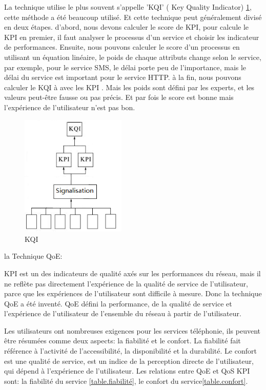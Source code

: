 La technique utilise le plus souvent s'appelle 'KQI' ( Key Quality Indicator) \ref{fig:kqi}, cette méthode a été beaucoup utilisé. Et cette technique peut généralement divisé en deux étapes. d'abord, nous devons calculer le score de KPI, pour calcule le KPI en premier, il faut analyser le processus d'un service et choisir les indicateur de performances. Ensuite, nous pouvons calculer le score d'un processus en utilisant un équation linéaire, le poids de chaque attributs change selon le service, par exemple, pour le service SMS, le délai porte peu de l'importance, mais le délai du service est important pour le service HTTP. \textsf{à} la fin, nous pouvons calculer le KQI à avec les KPI \cite{kqi}. Mais les poids sont défini par les experts, et les valeurs peut-être fausse ou pas précis. Et par fois le score est bonne mais l'expérience de l'utilisateur n'est pas bon.
\begin{figure}[H]
\centering
\includegraphics[width=5cm]{images/kqi}
\caption{KQI}
\label{fig:kqi}
\end{figure}

\textsf{la Technique QoE}:

KPI est un des indicateurs de qualité axés sur les performances du réseau, mais il ne reflète pas directement l'expérience de la qualité de service de l'utilisateur, parce que les expériences de l'utilisateur sont difficile à mesure. Donc la technique QoE a été inventé. QoE défini la performance, de la qualité de service et l'expérience de l'utilisateur de l'ensemble du réseau à partir de l'utilisateur.

Les utilisateurs ont nombreuses exigences pour les services téléphonie, ils peuvent être résumées comme deux aspects: la fiabilité et le confort. La fiabilité fait référence à l'activité de l'accessibilité, la disponibilité et la durabilité. Le confort est une qualité de service, est un indice de la perception directe de l'utilisateur, qui dépend à l'expérience de l'utilisateur\cite{QoE}. Les relations entre QoE et QoS KPI sont: la fiabilité du service \ref{table.fiabilité}, le confort du service\ref{table.confort}. 

